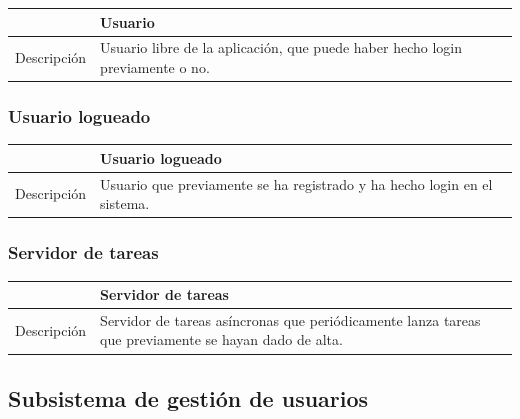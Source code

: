 \begin{center}
  \begin{tabularx}{\textwidth}{|c|X|}
    \hline
     & Usuario \\

    \hline

    Descripción & Usuario libre de la aplicación, que puede haber hecho login previamente o no. \\

    \hline
  \end{tabularx}

\end{center}


\subsubsection{Usuario logueado}

\begin{center}
  \centering
  \begin{tabularx}{\textwidth}{|c|X|}
    \hline
     & Usuario logueado \\

    \hline

    Descripción & Usuario que previamente se ha registrado y ha hecho login en el sistema. \\

    \hline
  \end{tabularx}
\end{center}

\subsubsection{Servidor de tareas}

\begin{center}
  \centering
  \begin{tabularx}{\textwidth}{|c|X|}
    \hline
     & Servidor de tareas \\

    \hline

    Descripción & Servidor de tareas asíncronas que periódicamente lanza tareas que previamente se hayan dado de alta. \\

    \hline
  \end{tabularx}
\end{center}

\subsection{Subsistema de gestión de usuarios}

